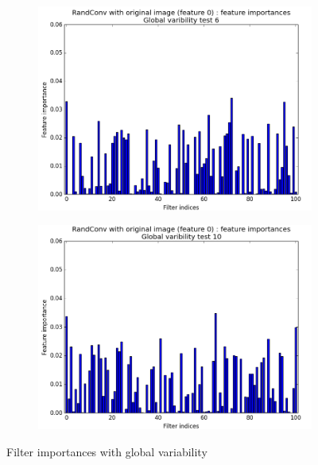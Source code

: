 \documentclass[a4paper]{report}
\begin{document}
\begin{figure}
\begin{subfigure}{.5\textwidth}
				\includegraphics[width=1.\linewidth]{images/FIGVar6.png}
				\caption{\label{fig:FIGVar6}}
			\end{subfigure}%
			\begin{subfigure}{.5\textwidth}
				\centering
				\includegraphics[width=1.\linewidth]{images/FIGVar10.png}
				\caption{\label{fig:FIGVar10}}
			\end{subfigure}
			\caption{\label{fig:FIGVar}Filter importances with global variability}
		\end{figure}
		
\end{document}
